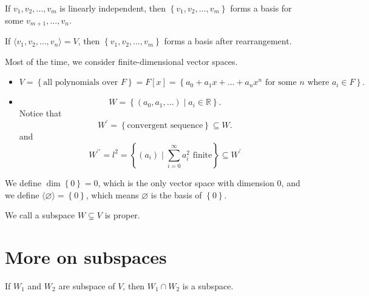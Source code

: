 \begin{corollary}
    If \(v_1, v_2, \dots , v_m\) is linearly independent, then \(\left\{ v_1, v_2, \dots , v_m \right\} \) forms a basis for some \(v_{m+1}, \dots , v_n\).  
\end{corollary}

\begin{theorem} \label{thm: srhink basis}
    If \(\langle v_1, v_2, \dots , v_n \rangle = V \), then \(\left\{ v_1, v_2, \dots , v_m \right\} \) forms a basis after rearrangement.  
\end{theorem}

\begin{remark}
    Most of the time, we consider finite-dimensional vector spaces.
\end{remark}

\begin{remark}
    \vphantom{text}
    \begin{itemize}
        \item     \[
        V = \left\{ \text{all polynomials over } F \right\} = F[x] = \left\{ a_0 + a_1 x + \dots + a_n x^n \text{ for some } n \text{ where } a_i \in F\right\}. 
    \]
        \item
    \[
        W = \left\{ (a_0, a_1, \dots ) \mid a_i \in \mathbb{R}  \right\}. 
    \]
    Notice that 
    \[
         W^{\prime} = \left\{ \text{convergent sequence} \right\} \subseteq W. 
    \] and 
    \[
        W^{\prime\prime}  = l^2 = \left\{ (a_i) \mid \sum_{i=0}^{\infty} a_i^2 \text{ finite}  \right\} \subseteq W^{\prime} 
    \]
    \end{itemize}
\end{remark}

\begin{remark}
    We define \(\dim \left\{ 0 \right\} = 0 \), which is the only vector space with dimension \(0\), and we define \(\langle \varnothing  \rangle = \left\{ 0 \right\}\), which means \(\varnothing \) is the basis of \(\left\{ 0 \right\} \).  
\end{remark}

\begin{note}
    We call a subspace \(W \subsetneq V\) is proper. 
\end{note}

\section{More on subspaces}
\begin{theorem} \label{thm: intersection of subspace is subspace}
    If \(W_1\) and \(W_2\) are subspace of \(V\), then \(W_1 \cap W_2\) is a subspace.    
\end{theorem}

